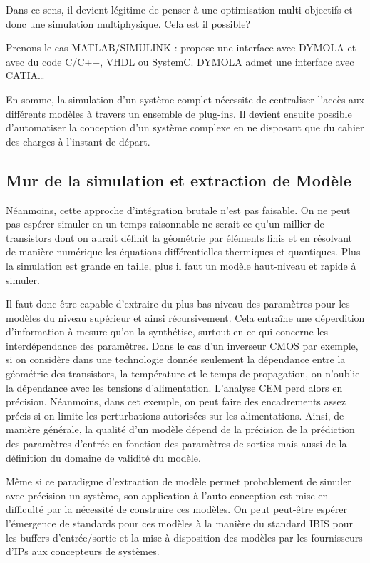 Dans ce sens, il devient légitime de penser à une optimisation multi-objectifs
et donc une simulation multiphysique. Cela est il possible?

Prenons le cas MATLAB/SIMULINK : propose une interface avec DYMOLA et avec du
code C/C++, VHDL ou SystemC. DYMOLA admet une interface avec CATIA\ldots

En somme, la simulation d'un système complet nécessite de centraliser l'accès
aux différents modèles à travers un ensemble de plug-ins. Il devient ensuite
possible d'automatiser la conception d'un système complexe en ne disposant que
du cahier des charges à l'instant de départ.

\subsection{Mur de la simulation et extraction de Modèle}

Néanmoins, cette approche d'intégration brutale n'est pas faisable. On ne peut
pas espérer simuler en un temps raisonnable ne serait ce qu'un millier de
transistors dont on aurait définit la géométrie par éléments finis et en
résolvant de manière numérique les équations différentielles thermiques et
quantiques. Plus la simulation est grande en taille, plus il faut un modèle
haut-niveau et rapide à simuler.

Il faut donc être capable d'extraire du plus bas niveau des paramètres pour les
modèles du niveau supérieur et ainsi récursivement. Cela entraîne une
déperdition d'information à mesure qu'on la synthétise, surtout en ce qui
concerne les interdépendance des paramètres. Dans le cas d'un inverseur CMOS
par exemple, si on considère dans une technologie donnée seulement la dépendance
entre la géométrie des transistors, la température et le temps de propagation,
on n'oublie la dépendance avec les tensions d'alimentation. L'analyse CEM
perd alors en précision. Néanmoins, dans cet exemple, on peut faire des
encadrements
assez précis si on limite les perturbations autorisées sur les alimentations.
Ainsi, de manière générale, la qualité d'un modèle dépend de la précision de la
prédiction des paramètres d'entrée en fonction des paramètres de sorties mais
aussi de la définition du domaine de validité du modèle.

Même si ce paradigme d'extraction de modèle permet probablement de simuler avec
précision un système, son application à l'auto-conception est mise en difficulté
par la nécessité de construire ces modèles. On peut peut-être espérer
l'émergence de standards pour ces modèles à la manière du standard IBIS pour les
buffers d'entrée/sortie et la mise à disposition des modèles par les
fournisseurs d'IPs aux concepteurs de systèmes.

